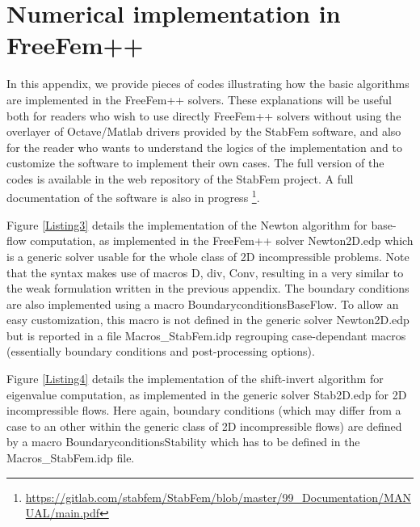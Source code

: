 \documentclass[twocolumn,10pt]{asme2ej}
\begin{document}
\begin{figure*}[t]
\small

 \normalsize
\caption{Illustration of the implementation of the shift-invert algorithm for single eigenmode computation (extract from FreeFem++ program {\sf  Stab2D.edp}).}
\label{Listing4}
\end{figure*}


\section{Numerical implementation in FreeFem++}

In this appendix, we provide pieces of codes illustrating how the basic algorithms are implemented in the FreeFem++ solvers.
These explanations will be useful both for readers who wish to use directly FreeFem++ solvers without using the overlayer of Octave/Matlab drivers provided by the StabFem software, and also for the reader who wants to understand the logics of the implementation and to customize the software to implement their own cases.
The full version of the codes is available in the web repository of the StabFem project.
A full documentation of the software is also in progress \footnote{\url{https://gitlab.com/stabfem/StabFem/blob/master/99_Documentation/MANUAL/main.pdf}}.

Figure \ref{Listing3} details the implementation of the Newton algorithm for base-flow computation, as implemented in the FreeFem++ solver {\sf  Newton2D.edp} which is a generic solver usable for the whole class of 2D incompressible problems.
Note that the syntax makes use of macros {\sf  D, div, Conv}, resulting in a very similar to the weak formulation written in the previous appendix. The boundary conditions are also implemented using a macro {\sf  BoundaryconditionsBaseFlow}.
To allow an easy customization, this macro is not defined in the generic solver {\sf  Newton2D.edp} but is reported in a file {\sf  Macros\_StabFem.idp} regrouping case-dependant macros (essentially boundary conditions and post-processing options).

Figure \ref{Listing4} details the implementation of the shift-invert algorithm for eigenvalue computation, as implemented in the generic solver {\sf  Stab2D.edp} for 2D incompressible flows.
Here again, boundary conditions (which may differ from a case to an other within the generic class of 2D incompressible flows) are defined by a macro {\sf  BoundaryconditionsStability} which has to be defined in the  {\sf  Macros\_StabFem.idp} file.
\end{document}
